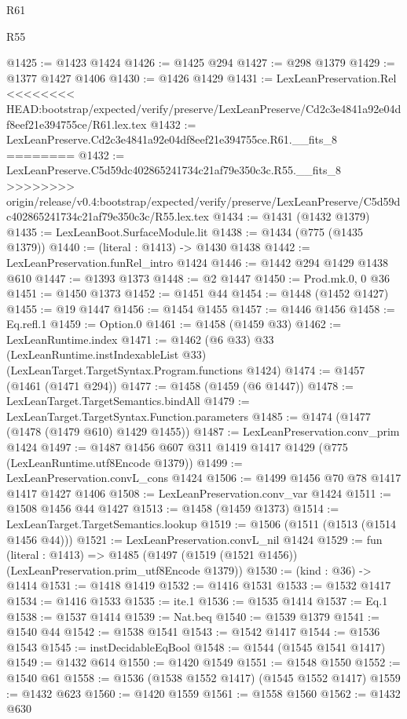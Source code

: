 \begin{lexlean}{R61}
\begin{lexlean}{R55}
\begin{coremodule}
{{{{{{{{{{{{{{{{{{{{{{{{{{{{{{{{{{{{{{{{{{{{{{{{{{{{{{{{{{{{{{@1425 := @1423 @1424
@1426 := @1425 @294
@1427 := @298 @1379
@1429 := @1377 @1427 @1406
@1430 := @1426 @1429
@1431 := LexLeanPreservation.Rel
<<<<<<<< HEAD:bootstrap/expected/verify/preserve/LexLeanPreserve/Cd2c3e4841a92e04df8eef21e394755ce/R61.lex.tex
@1432 := LexLeanPreserve.Cd2c3e4841a92e04df8eef21e394755ce.R61.__fits_8
========
@1432 := LexLeanPreserve.C5d59dc402865241734c21af79e350c3c.R55.__fits_8
>>>>>>>> origin/release/v0.4:bootstrap/expected/verify/preserve/LexLeanPreserve/C5d59dc402865241734c21af79e350c3c/R55.lex.tex
@1434 := @1431 (@1432 @1379)
@1435 := LexLeanBoot.SurfaceModule.lit
@1438 := @1434 (@775 (@1435 @1379))
@1440 := (literal : @1413) -> @1430 @1438
@1442 := LexLeanPreservation.funRel_intro @1424
@1446 := @1442 @294 @1429 @1438 @610
@1447 := @1393 @1373
@1448 := @2 @1447
@1450 := Prod.mk.{0, 0} @36
@1451 := @1450 @1373
@1452 := @1451 @44
@1454 := @1448 (@1452 @1427)
@1455 := @19 @1447
@1456 := @1454 @1455
@1457 := @1446 @1456
@1458 := Eq.refl.{1}
@1459 := Option.{0}
@1461 := @1458 (@1459 @33)
@1462 := LexLeanRuntime.index
@1471 := @1462
    (@6 @33)
    @33
    (LexLeanRuntime.instIndexableList @33)
    (LexLeanTarget.TargetSyntax.Program.functions @1424)
@1474 := @1457 (@1461 (@1471 @294))
@1477 := @1458 (@1459 (@6 @1447))
@1478 := LexLeanTarget.TargetSemantics.bindAll
@1479 := LexLeanTarget.TargetSyntax.Function.parameters
@1485 := @1474 (@1477 (@1478 (@1479 @610) @1429 @1455))
@1487 := LexLeanPreservation.conv_prim @1424
@1497 := @1487 @1456 @607 @311 @1419 @1417 @1429 (@775 (LexLeanRuntime.utf8Encode @1379))
@1499 := LexLeanPreservation.convL_cons @1424
@1506 := @1499 @1456 @70 @78 @1417 @1417 @1427 @1406
@1508 := LexLeanPreservation.conv_var @1424
@1511 := @1508 @1456 @44 @1427
@1513 := @1458 (@1459 @1373)
@1514 := LexLeanTarget.TargetSemantics.lookup
@1519 := @1506 (@1511 (@1513 (@1514 @1456 @44)))
@1521 := LexLeanPreservation.convL_nil @1424
@1529 := fun (literal : @1413) =>
  @1485 (@1497 (@1519 (@1521 @1456)) (LexLeanPreservation.prim_utf8Encode @1379))
@1530 := (kind : @36) -> @1414
@1531 := @1418 @1419
@1532 := @1416 @1531
@1533 := @1532 @1417
@1534 := @1416 @1533
@1535 := ite.{1}
@1536 := @1535 @1414
@1537 := Eq.{1}
@1538 := @1537 @1414
@1539 := Nat.beq
@1540 := @1539 @1379
@1541 := @1540 @44
@1542 := @1538 @1541
@1543 := @1542 @1417
@1544 := @1536 @1543
@1545 := instDecidableEqBool
@1548 := @1544 (@1545 @1541 @1417)
@1549 := @1432 @614
@1550 := @1420 @1549
@1551 := @1548 @1550
@1552 := @1540 @61
@1558 := @1536 (@1538 @1552 @1417) (@1545 @1552 @1417)
@1559 := @1432 @623
@1560 := @1420 @1559
@1561 := @1558 @1560
@1562 := @1432 @630
}}}}}}}}}}}}}}}}}}}}}}}}}}}}}}}}}}}}}}}}}}}}}}}}}}}}}}}}}}}}}}
\end{coremodule}
\end{lexlean}
\end{lexlean}
